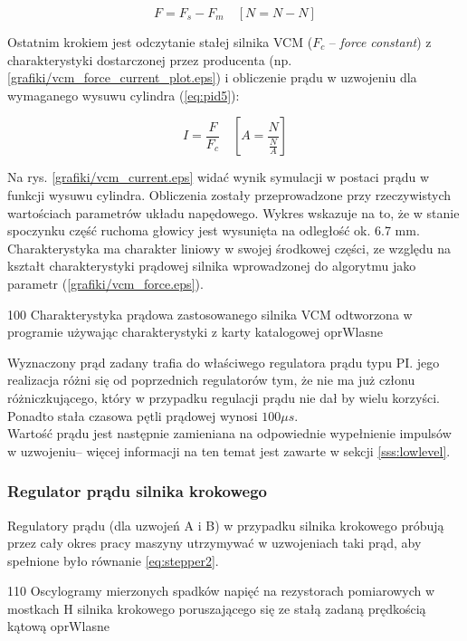 \begin{equation} \label{eq:pid5}
	F = F_s - F_m \quad [ N = N - N ]
\end{equation}

Ostatnim krokiem jest odczytanie stałej silnika VCM ($ F_c $ -- {\it force constant}) z charakterystyki dostarczonej przez producenta (np. \ref{grafiki/vcm_force_current_plot.eps}) i obliczenie prądu w uzwojeniu dla wymaganego wysuwu cylindra (\ref{eq:pid5}):

\begin{equation} \label{eq:pid6}
	I = \frac{F}{F_c} \quad [ A = \frac{N}{\frac{N}{A}} ]
\end{equation}
	
Na rys. \ref{grafiki/vcm_current.eps} widać wynik symulacji w postaci prądu w funkcji wysuwu cylindra. Obliczenia zostały przeprowadzone przy rzeczywistych wartościach parametrów układu napędowego. Wykres wskazuje na to, że w stanie spoczynku część ruchoma głowicy jest wysunięta na odległość ok. 6.7 mm. Charakterystyka ma charakter liniowy w swojej środkowej części, ze względu na kształt charakterystyki prądowej silnika wprowadzonej do algorytmu jako parametr (\ref{grafiki/vcm_force.eps}). 

	{100}
	{Charakterystyka prądowa zastosowanego silnika VCM odtworzona w programie używając charakterystyki z karty katalogowej}
	{oprWlasne}

Wyznaczony prąd zadany trafia do właściwego regulatora prądu typu PI. jego realizacja różni się od poprzednich regulatorów tym, że nie ma już członu różniczkującego, który w przypadku regulacji prądu nie dał by wielu korzyści. Ponadto stała czasowa pętli prądowej wynosi $ 100 \mu s $. \\

Wartość prądu jest następnie zamieniana na odpowiednie wypełnienie impulsów w uzwojeniu-- więcej informacji na ten temat jest zawarte w sekcji \ref{sss:lowlevel}.
	
\clearpage

\subsubsection{Regulator prądu silnika krokowego}

Regulatory prądu (dla uzwojeń A i B) w przypadku silnika krokowego próbują przez cały okres pracy maszyny utrzymywać w uzwojeniach taki prąd, aby spełnione było równanie \ref{eq:stepper2}. 

	{110}
	{Oscylogramy mierzonych spadków napięć na rezystorach pomiarowych w mostkach H silnika krokowego poruszającego się ze stałą zadaną prędkością kątową}
	{oprWlasne}

